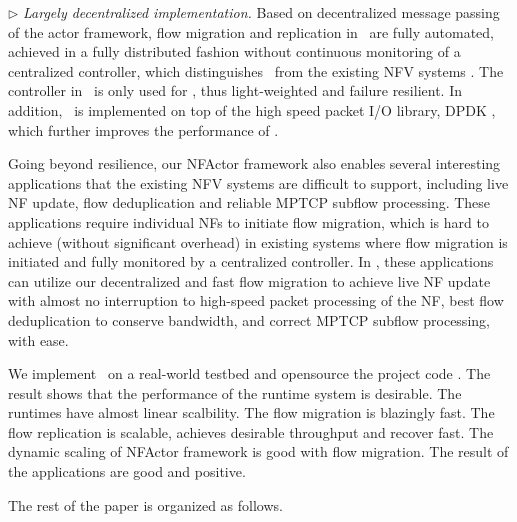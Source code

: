 $\triangleright$ {\em Largely decentralized implementation.} Based on decentralized message passing of the actor framework, flow migration and replication in \nfactor~are fully automated, achieved in a fully distributed fashion without continuous monitoring of a centralized controller, which distinguishes \nfactor~from the existing NFV systems \cite{gember2015opennf}. The controller in \nfactor~is only used for , thus light-weighted and failure resilient. In addition, \nfactor~is implemented on top of the high speed packet I/O library, DPDK \cite{dpdk}, which further improves the performance of \nfactor.



Going beyond resilience, our NFActor framework also enables several interesting applications that the existing NFV systems are difficult to support, including live NF update, flow deduplication and reliable MPTCP subflow processing. These applications require individual NFs to initiate flow migration, %
which is hard to achieve (without significant overhead) in existing systems where flow migration is initiated and fully monitored by a centralized controller. In \nfactor, these applications can utilize our decentralized and fast flow migration to achieve live NF update with almost no interruption to high-speed packet processing of the NF, best flow deduplication to conserve bandwidth, and correct MPTCP subflow processing, with ease. %

We implement \nfactor~on a real-world testbed and opensource the project code \cite{projectcode} .  The result shows that the performance of the runtime system is desirable. The runtimes have almost linear scalbility. The flow migration is blazingly fast. The flow replication is scalable, achieves desirable throughput and recover fast. The dynamic scaling of NFActor framework is good with flow migration. The result of the applications are good and positive.


The rest of the paper is organized as follows.  %








